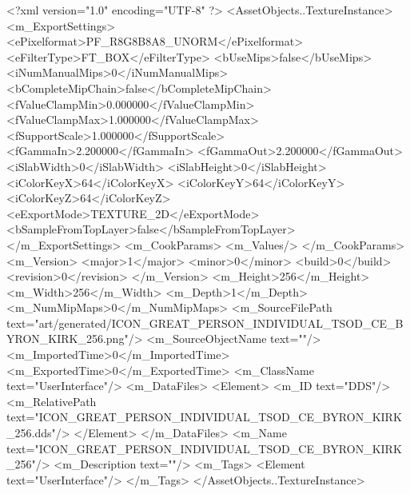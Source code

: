 <?xml version="1.0" encoding="UTF-8" ?>
<AssetObjects..TextureInstance>
	<m_ExportSettings>
		<ePixelformat>PF_R8G8B8A8_UNORM</ePixelformat>
		<eFilterType>FT_BOX</eFilterType>
		<bUseMips>false</bUseMips>
		<iNumManualMips>0</iNumManualMips>
		<bCompleteMipChain>false</bCompleteMipChain>
		<fValueClampMin>0.000000</fValueClampMin>
		<fValueClampMax>1.000000</fValueClampMax>
		<fSupportScale>1.000000</fSupportScale>
		<fGammaIn>2.200000</fGammaIn>
		<fGammaOut>2.200000</fGammaOut>
		<iSlabWidth>0</iSlabWidth>
		<iSlabHeight>0</iSlabHeight>
		<iColorKeyX>64</iColorKeyX>
		<iColorKeyY>64</iColorKeyY>
		<iColorKeyZ>64</iColorKeyZ>
		<eExportMode>TEXTURE_2D</eExportMode>
		<bSampleFromTopLayer>false</bSampleFromTopLayer>
	</m_ExportSettings>
	<m_CookParams>
		<m_Values/>
	</m_CookParams>
	<m_Version>
		<major>1</major>
		<minor>0</minor>
		<build>0</build>
		<revision>0</revision>
	</m_Version>
	<m_Height>256</m_Height>
	<m_Width>256</m_Width>
	<m_Depth>1</m_Depth>
	<m_NumMipMaps>0</m_NumMipMaps>
	<m_SourceFilePath text="art/generated/ICON_GREAT_PERSON_INDIVIDUAL_TSOD_CE_BYRON_KIRK_256.png"/>
	<m_SourceObjectName text=""/>
	<m_ImportedTime>0</m_ImportedTime>
	<m_ExportedTime>0</m_ExportedTime>
	<m_ClassName text="UserInterface"/>
	<m_DataFiles>
		<Element>
			<m_ID text="DDS"/>
			<m_RelativePath text="ICON_GREAT_PERSON_INDIVIDUAL_TSOD_CE_BYRON_KIRK_256.dds"/>
		</Element>
	</m_DataFiles>
	<m_Name text="ICON_GREAT_PERSON_INDIVIDUAL_TSOD_CE_BYRON_KIRK_256"/>
	<m_Description text=""/>
	<m_Tags>
		<Element text="UserInterface"/>
	</m_Tags>
</AssetObjects..TextureInstance>
